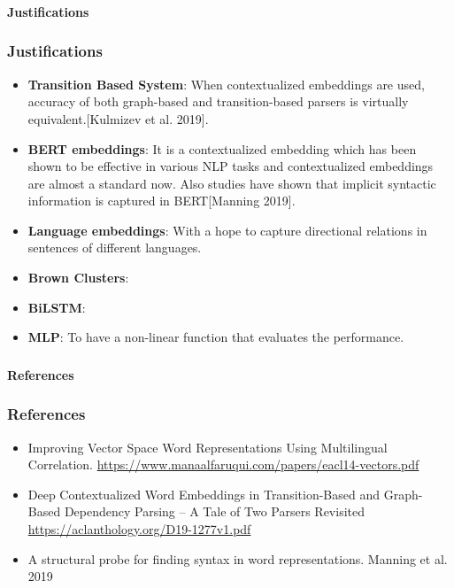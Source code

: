 \documentclass{beamer}
\begin{document}
\begin{frame}
\frametitle{}
\huge\textbf{Justifications}
\end{frame}

\begin{frame}
\frametitle{Justifications}
\begin{itemize}
    \item \textbf{Transition Based System}: When contextualized embeddings are used, accuracy of both graph-based and transition-based parsers is virtually equivalent.[Kulmizev et al. 2019].
    \item \textbf{BERT embeddings}: It is a contextualized embedding which has been shown to be effective in various NLP tasks and contextualized embeddings are almost a standard now. Also studies have shown that implicit syntactic information is captured in BERT[Manning 2019].
    \item \textbf{Language embeddings}: With a hope to capture directional relations in sentences of different languages.
    \item \textbf{Brown Clusters}:
    \item \textbf{BiLSTM}:
    \item \textbf{MLP}: To have a non-linear function that evaluates the performance.
\end{itemize}
\end{frame}

\begin{frame}
\frametitle{}
\huge\textbf{References}
\end{frame}


\begin{frame}
\frametitle{References}
\begin{itemize}
    \item Improving Vector Space Word Representations Using Multilingual Correlation. \url{https://www.manaalfaruqui.com/papers/eacl14-vectors.pdf}
    \item Deep Contextualized Word Embeddings in Transition-Based and Graph-Based Dependency Parsing – A Tale of Two Parsers Revisited \url{https://aclanthology.org/D19-1277v1.pdf}
    \item A structural probe for finding syntax in word representations. Manning et al. 2019
\end{itemize}
\end{frame}
\end{document}
